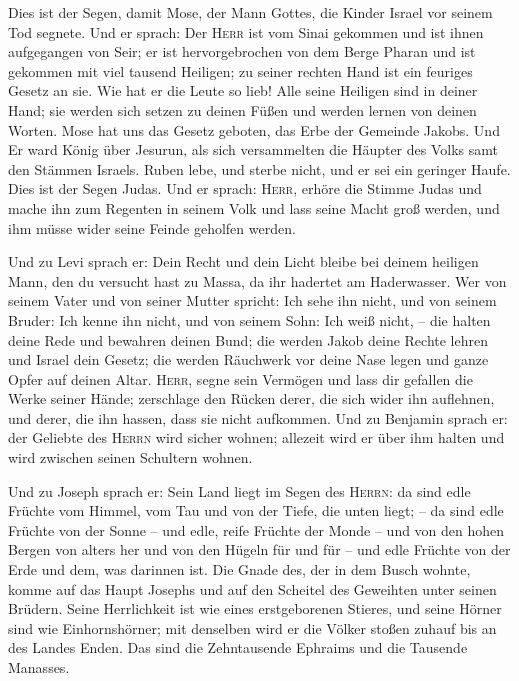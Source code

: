  Dies ist der Segen, damit Mose, der Mann Gottes, die
Kinder Israel vor seinem Tod segnete.  Und er sprach: Der
\textsc{Herr} ist vom Sinai gekommen und ist ihnen aufgegangen von Seir;
er ist hervorgebrochen von dem Berge Pharan und ist gekommen mit viel
tausend Heiligen; zu seiner rechten Hand ist ein feuriges Gesetz an sie.
 Wie hat er die Leute so lieb! Alle seine Heiligen sind in
deiner Hand; sie werden sich setzen zu deinen Füßen und werden lernen
von deinen Worten.  Mose hat uns das Gesetz geboten, das
Erbe der Gemeinde Jakobs.  Und Er ward König über Jesurun,
als sich versammelten die Häupter des Volks samt den Stämmen Israels.
 Ruben lebe, und sterbe nicht, und er sei ein geringer
Haufe.  Dies ist der Segen Judas. Und er sprach:
\textsc{Herr}, erhöre die Stimme Judas und mache ihn zum Regenten in
seinem Volk und lass seine Macht groß werden, und ihm müsse wider seine
Feinde geholfen werden.

 Und zu Levi sprach er: Dein Recht und dein Licht bleibe
bei deinem heiligen Mann, den du versucht hast zu Massa, da ihr hadertet
am Haderwasser.  Wer von seinem Vater und von seiner
Mutter spricht: Ich sehe ihn nicht, und von seinem Bruder: Ich kenne ihn
nicht, und von seinem Sohn: Ich weiß nicht, -- die halten deine Rede und
bewahren deinen Bund;  die werden Jakob deine Rechte
lehren und Israel dein Gesetz; die werden Räuchwerk vor deine Nase legen
und ganze Opfer auf deinen Altar.  \textsc{Herr}, segne
sein Vermögen und lass dir gefallen die Werke seiner Hände; zerschlage
den Rücken derer, die sich wider ihn auflehnen, und derer, die ihn
hassen, dass sie nicht aufkommen.  Und zu Benjamin sprach
er: der Geliebte des \textsc{Herrn} wird sicher wohnen; allezeit wird er
über ihm halten und wird zwischen seinen Schultern wohnen.

 Und zu Joseph sprach er: Sein Land liegt im Segen des
\textsc{Herrn}: da sind edle Früchte vom Himmel, vom Tau und von der
Tiefe, die unten liegt; --  da sind edle Früchte von der
Sonne -- und edle, reife Früchte der Monde --  und von
den hohen Bergen von alters her und von den Hügeln für und für --
 und edle Früchte von der Erde und dem, was darinnen ist.
Die Gnade des, der in dem Busch wohnte, komme auf das Haupt Josephs und
auf den Scheitel des Geweihten unter seinen Brüdern. 
Seine Herrlichkeit ist wie eines erstgeborenen Stieres, und seine Hörner
sind wie Einhornshörner; mit denselben wird er die Völker stoßen zuhauf
bis an des Landes Enden. Das sind die Zehntausende Ephraims und die
Tausende Manasses.


